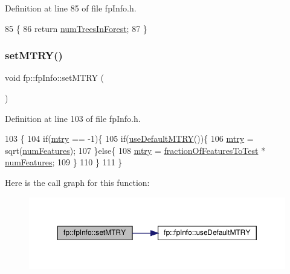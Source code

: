 Definition at line 85 of file fp\+Info.\+h.


\begin{DoxyCode}
85                                        \{
86                 \textcolor{keywordflow}{return} \hyperlink{classfp_1_1fpInfo_a8dbd62dca5c972c29d29a69d90ca2632}{numTreesInForest};
87             \}
\end{DoxyCode}
\mbox{\label{classfp_1_1fpInfo_a6b2a54fb9b3672e7b1bab3474a0ca33f}} 
\subsubsection{\texorpdfstring{set\+M\+T\+R\+Y()}{setMTRY()}}
{\footnotesize\ttfamily void fp\+::fp\+Info\+::set\+M\+T\+RY (\begin{DoxyParamCaption}{ }\end{DoxyParamCaption})\hspace{0.3cm}{\ttfamily [inline]}}



Definition at line 103 of file fp\+Info.\+h.


\begin{DoxyCode}
103                                  \{
104                 \textcolor{keywordflow}{if}(\hyperlink{classfp_1_1fpInfo_a62cccc1eb5641ebec2a6cc86cf03eedf}{mtry} == -1)\{
105                     \textcolor{keywordflow}{if}(\hyperlink{classfp_1_1fpInfo_a0a00d3d54cef667000249202a2d768bf}{useDefaultMTRY}())\{
106                         \hyperlink{classfp_1_1fpInfo_a62cccc1eb5641ebec2a6cc86cf03eedf}{mtry} = sqrt(\hyperlink{classfp_1_1fpInfo_a6ed8deabebae772fc213730cd29a2e61}{numFeatures});
107                     \}\textcolor{keywordflow}{else}\{
108                         \hyperlink{classfp_1_1fpInfo_a62cccc1eb5641ebec2a6cc86cf03eedf}{mtry} = \hyperlink{classfp_1_1fpInfo_ab949cb97523283367e9b120fd78e3c3b}{fractionOfFeaturesToTest} * 
      \hyperlink{classfp_1_1fpInfo_a6ed8deabebae772fc213730cd29a2e61}{numFeatures};
109                     \}
110                 \}
111             \}
\end{DoxyCode}
Here is the call graph for this function\+:\nopagebreak
\begin{figure}[H]
\begin{center}
\leavevmode
\includegraphics[width=350pt]{classfp_1_1fpInfo_a6b2a54fb9b3672e7b1bab3474a0ca33f_cgraph}
\end{center}
\end{figure}
\mbox{\label{classfp_1_1fpInfo_a3598d1ab13bf05b53858b1ca8c44fa68}} 
